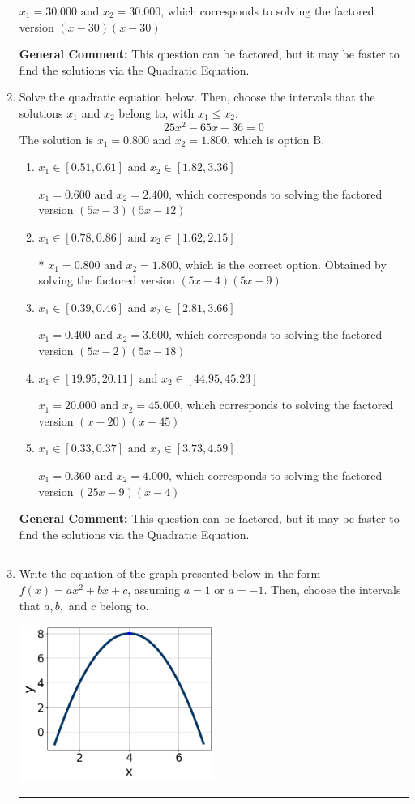 \documentclass{extbook}[14pt]
\newcommand{\litem}[1]{\item #1

\rule{\textwidth}{0.4pt}}
\begin{document}
\begin{enumerate}
{\begin{enumerate}[label=\Alph*.]
$x_1 = 30.000 \text{ and } x_2 = 30.000$, which corresponds to solving the factored version $(x -30)(x -30)$
\end{enumerate}

\textbf{General Comment:} This question can be factored, but it may be faster to find the solutions via the Quadratic Equation.
}
\litem{
Solve the quadratic equation below. Then, choose the intervals that the solutions $x_1$ and $x_2$ belong to, with $x_1 \leq x_2$.
\[ 25x^{2} -65 x + 36 = 0 \]The solution is \( x_1 = 0.800 \text{ and } x_2 = 1.800 \), which is option B.\begin{enumerate}[label=\Alph*.]
\item \( x_1 \in [0.51, 0.61] \text{ and } x_2 \in [1.82, 3.36] \)

$x_1 = 0.600 \text{ and } x_2 = 2.400$, which corresponds to solving the factored version $(5x -3)(5x -12)$
\item \( x_1 \in [0.78, 0.86] \text{ and } x_2 \in [1.62, 2.15] \)

* $x_1 = 0.800 \text{ and } x_2 = 1.800$, which is the correct option. Obtained by solving the factored version $(5x -4)(5x -9)$
\item \( x_1 \in [0.39, 0.46] \text{ and } x_2 \in [2.81, 3.66] \)

$x_1 = 0.400 \text{ and } x_2 = 3.600$, which corresponds to solving the factored version $(5x -2)(5x -18)$
\item \( x_1 \in [19.95, 20.11] \text{ and } x_2 \in [44.95, 45.23] \)

$x_1 = 20.000 \text{ and } x_2 = 45.000$, which corresponds to solving the factored version $(x -20)(x -45)$
\item \( x_1 \in [0.33, 0.37] \text{ and } x_2 \in [3.73, 4.59] \)

$x_1 = 0.360 \text{ and } x_2 = 4.000$, which corresponds to solving the factored version $(25x -9)(x -4)$
\end{enumerate}

\textbf{General Comment:} This question can be factored, but it may be faster to find the solutions via the Quadratic Equation.
}
\litem{
Write the equation of the graph presented below in the form $f(x)=ax^2+bx+c$, assuming  $a=1$ or $a=-1$. Then, choose the intervals that $a, b,$ and $c$ belong to.

\begin{center}
    \includegraphics[width=0.5\textwidth]{../Figures/quadraticGraphToEquationC.png}
\end{center}


}
\end{enumerate}
\end{document}
